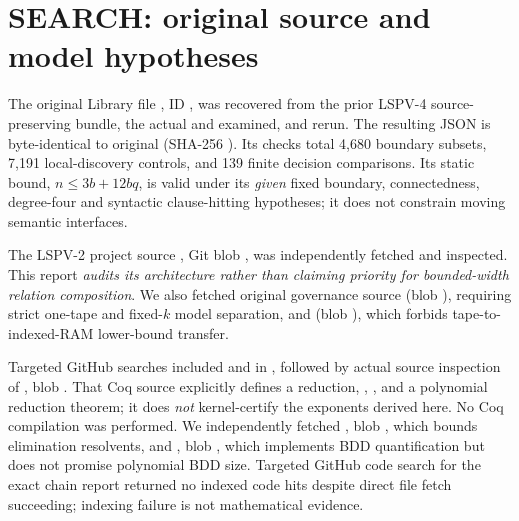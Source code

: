 \documentclass[11pt]{article}
\begin{document}
\section{SEARCH: original source and model hypotheses}
The original Library file , ID , was recovered from the prior LSPV-4 source-preserving bundle, the actual  and  examined, and  rerun. The resulting JSON is byte-identical to original  (SHA-256 ). Its checks total 4,680 boundary subsets, 7,191 local-discovery controls, and 139 finite decision comparisons. Its static bound, $n\le3b+12bq$, is valid under its \emph{given} fixed boundary, connectedness, degree-four and syntactic clause-hitting hypotheses; it does not constrain moving semantic interfaces.

The LSPV-2 project source , Git blob , was independently fetched and inspected. This report \emph{audits its architecture rather than claiming priority for bounded-width relation composition}. We also fetched original  governance source  (blob ), requiring strict one-tape and fixed-$k$ model separation, and  (blob ), which forbids tape-to-indexed-RAM lower-bound transfer.

Targeted GitHub searches included  and  in , followed by actual source inspection of , blob . That Coq source explicitly defines a reduction, , , and a polynomial reduction theorem; it does \emph{not} kernel-certify the exponents derived here. No Coq compilation was performed. We independently fetched , blob , which bounds elimination resolvents, and , blob , which implements BDD quantification but does not promise polynomial BDD size. Targeted GitHub code search for the exact chain report returned no indexed code hits despite direct file fetch succeeding; indexing failure is not mathematical evidence.
\end{document}

